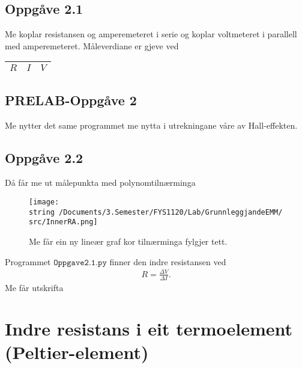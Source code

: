 \documentclass[11pt, a4paper]{article}
\begin{document}
  \subsection*{Oppgåve 2.1}
    Me koplar resistansen og amperemeteret i serie og koplar voltmeteret i parallell med amperemeteret.
    Måleverdiane er gjeve ved
    \begin{center}
      \begin{tabular}{|l||l|l|}
        \hline
        $R$ & $I$ & $V$ \\
        \hline
        
        \hline
      \end{tabular}
    \end{center}


  \subsection*{PRELAB-Oppgåve 2}
    Me nytter det same programmet me nytta i utrekningane våre av Hall-effekten.
    

  
  \subsection*{Oppgåve 2.2}
     Då får me ut målepunkta med polynomtilnærminga
    \begin{figure}[H]
      \centering
      \texttt{[image: \\string~/Documents/3.Semester/FYS1120/Lab/GrunnleggjandeEMM/src/InnerRA.png]}
      \caption{Me får ein ny lineær graf kor tilnærminga fylgjer tett.}
    \end{figure}

    Programmet $\texttt{Oppgave2.1.py}$ finner den indre resistansen ved
    \begin{align*}
      R = \frac{\Delta V}{\Delta I}.
    \end{align*}
    Me får utskrifta
    \begin{center}
      
    \end{center}


\newpage


\section*{Indre resistans i eit termoelement (Peltier-element)}
\end{document}
